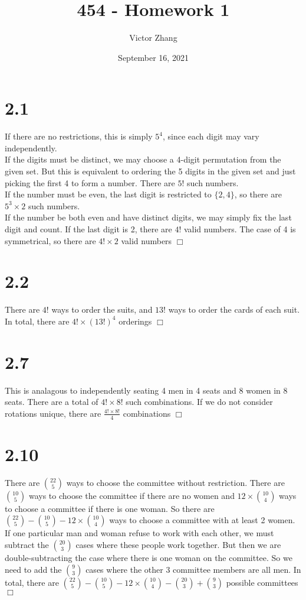\documentclass{article}
\title{454 - Homework 1}
\author{Victor Zhang}
\date{September 16, 2021}
\begin{document}
\maketitle

\section*{2.1}
If there are no restrictions, this is simply $5^4$, since each digit may vary independently.\\
If the digits must be distinct, we may choose a 4-digit permutation from the given set. But this is equivalent to ordering the 5 digits in the given set and just picking the first 4 to form a number. There are $5!$ such numbers.\\
If the number must be even, the last digit is restricted to $\{2,4\}$, so there are $5^3 \times 2$ such numbers.\\
If the number be both even and have distinct digits, we may simply fix the last digit and count. If the last digit is 2, there are $4!$ valid numbers. The case of 4 is symmetrical, so there are $4! \times 2$ valid numbers $\Box$

\section*{2.2}
There are $4!$ ways to order the suits, and $13!$ ways to order the cards of each suit. In total, there are $4! \times (13!)^4$ orderings $\Box$

\section*{2.7}
This is analagous to independently seating 4 men in 4 seats and 8 women in 8 seats. There are a total of $4! \times 8!$ such combinations. If we do not consider rotations unique, there are $\frac{4! \times 8!}{4}$ combinations $\Box$

\section*{2.10}
There are $\binom{22}{5}$ ways to choose the committee without restriction. There are $\binom{10}{5}$ ways to choose the committee if there are no women and $12 \times \binom{10}{4}$ ways to choose a committee if there is one woman. So there are $\binom{22}{5} - \binom{10}{5} - 12 \times \binom{10}{4}$ ways to choose a committee with at least 2 women.\\
If one particular man and woman refuse to work with each other, we must subtract the $\binom{20}{3}$ cases where these people work together. But then we are double-subtracting the case where there is one woman on the committee. So we need to add the $\binom{9}{3}$ cases where the other 3 committee members are all men. In total, there are $\binom{22}{5} - \binom{10}{5} - 12 \times \binom{10}{4} - \binom{20}{3} + \binom{9}{3}$ possible committees $\Box$
\end{document}
